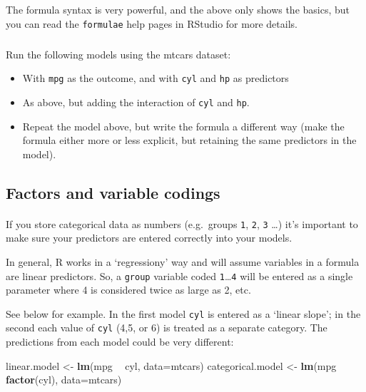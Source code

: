 \documentclass[]{article}
\newenvironment{Shaded}{\begin{snugshade}}{\end{snugshade}}
\newcommand{\DataTypeTok}[1]{\textcolor[rgb]{0.13,0.29,0.53}{#1}}
\newcommand{\KeywordTok}[1]{\textcolor[rgb]{0.13,0.29,0.53}{\textbf{#1}}}
\newcommand{\NormalTok}[1]{#1}
\newcommand{\OperatorTok}[1]{\textcolor[rgb]{0.81,0.36,0.00}{\textbf{#1}}}
\newcommand{\StringTok}[1]{\textcolor[rgb]{0.31,0.60,0.02}{#1}}
\let\oldparagraph\paragraph
\renewcommand{\paragraph}[1]{\oldparagraph{#1}\mbox{}}
\let\oldsubparagraph\subparagraph
\renewcommand{\subparagraph}[1]{\oldsubparagraph{#1}\mbox{}}
\begin{document}
The formula syntax is very powerful, and the above only shows the basics, but
you can read the \texttt{formulae} help pages in RStudio for more details.

\hypertarget{section-9}{%
\subparagraph{}\label{section-9}}

Run the following models using the mtcars dataset:

\begin{itemize}
\item
  With \texttt{mpg} as the outcome, and with \texttt{cyl} and \texttt{hp} as predictors
\item
  As above, but adding the interaction of \texttt{cyl} and \texttt{hp}.
\item
  Repeat the model above, but write the formula a different way (make the
  formula either more or less explicit, but retaining the same predictors in
  the model).
\end{itemize}

\hypertarget{factors-and-variable-codings}{%
\subsection*{Factors and variable codings}\label{factors-and-variable-codings}}

\hypertarget{factors-vs-linear-inputs}{%
\paragraph{}\label{factors-vs-linear-inputs}}

If you store categorical data as numbers (e.g.~groups \texttt{1}, \texttt{2}, \texttt{3} \ldots{}) it's
important to make sure your predictors are entered correctly into your models.

In general, R works in a `regressiony' way and will assume variables in a
formula are linear predictors. So, a \texttt{group} variable coded \texttt{1}\ldots{}\texttt{4} will be
entered as a single parameter where 4 is considered twice as large as 2, etc.

See below for example. In the first model \texttt{cyl} is entered as a `linear slope';
in the second each value of \texttt{cyl} (4,5, or 6) is treated as a separate category.
The predictions from each model could be very different:

\begin{Shaded}
\begin{Highlighting}[]
\NormalTok{linear.model <-}\StringTok{ }\KeywordTok{lm}\NormalTok{(mpg }\OperatorTok{~}\StringTok{ }\NormalTok{cyl, }\DataTypeTok{data=}\NormalTok{mtcars)}
\NormalTok{categorical.model <-}\StringTok{ }\KeywordTok{lm}\NormalTok{(mpg }\OperatorTok{~}\StringTok{ }\KeywordTok{factor}\NormalTok{(cyl), }\DataTypeTok{data=}\NormalTok{mtcars)}
\end{Highlighting}
\end{Shaded}
\end{document}
